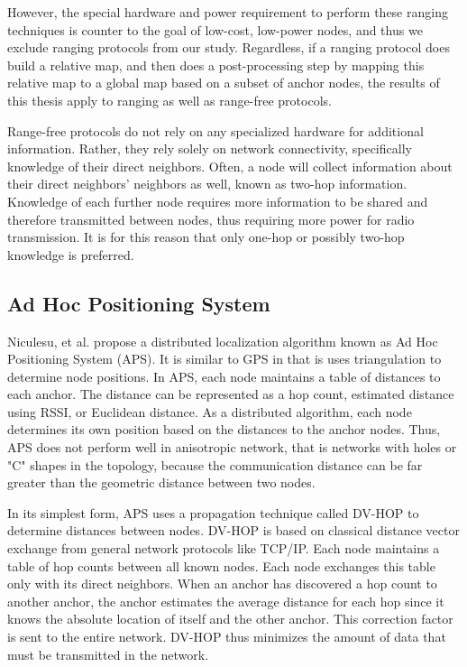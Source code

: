 However, the special hardware and power requirement to perform these ranging techniques is counter to the goal of low-cost, low-power nodes, and thus we exclude ranging protocols from our study.  Regardless, if a ranging protocol does build a relative map, and then does a post-processing step by mapping this relative map to a global map based on a subset of anchor nodes, the results of this thesis apply to ranging as well as range-free protocols.

Range-free protocols do not rely on any specialized hardware for additional information.  Rather, they rely solely on network connectivity, specifically knowledge of their direct neighbors.  Often, a node will collect information about their direct neighbors' neighbors as well, known as two-hop information.  Knowledge of each further node requires more information to be shared and therefore transmitted between nodes, thus requiring more power for radio transmission.  It is for this reason that only one-hop or possibly two-hop knowledge is preferred.

\subsection{Ad Hoc Positioning System}
Niculesu, et al. propose a distributed localization algorithm known as Ad Hoc Positioning System (APS)\cite{APS}.  It is similar to GPS in that is uses triangulation to determine node positions.  In APS, each node maintains a table of distances to each anchor.  The distance can be represented as a hop count, estimated distance using RSSI, or Euclidean distance.  As a distributed algorithm, each node determines its own position based on the distances to the anchor nodes.  Thus, APS does not perform well in anisotropic network, that is networks with holes or "C" shapes in the topology, because the communication distance can be far greater than the geometric distance between two nodes.

In its simplest form, APS uses a propagation technique called DV-HOP to determine distances between nodes.  DV-HOP is based on classical distance vector exchange from general network protocols like TCP/IP.  Each node maintains a table of hop counts between all known nodes.  Each node exchanges this table only with its direct neighbors.  When an anchor has discovered a hop count to another anchor, the anchor estimates the average distance for each hop since it knows the absolute location of itself and the other anchor. 
This correction factor is sent to the entire network.  DV-HOP thus minimizes the amount of data that must be transmitted in the network.  

